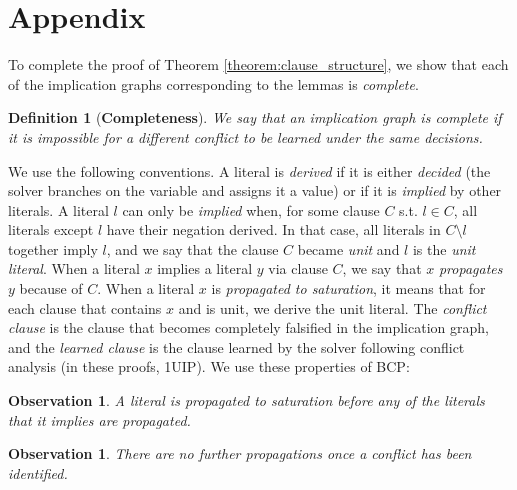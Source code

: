 \documentclass[10pt,a4paper]{article}
\newtheorem{definition}[theorem]{Definition}
\newtheorem{observation}[theorem]{Observation}
\begin{document}
\newpage 



\newpage

\section{Appendix}
To complete the proof of Theorem \ref{theorem:clause_structure}, we show that each of the implication graphs corresponding to the lemmas is \textit{complete}.

\begin{definition}[\bf Completeness]
We say that an implication graph is complete if it is impossible for a different conflict to be learned under the same decisions. 
\end{definition}

We use the following conventions. A literal is \textit{derived} if it is either \textit{decided} (the solver branches on the variable and assigns it a value) or if it is \textit{implied} by other literals. A literal $l$ can only be \textit{implied} when, for some clause $C$ s.t. $l \in C$, all literals except $l$ have their negation derived. In that case, all literals in $C \setminus l$ together imply $l$, and we say that the clause $C$ became \textit{unit} and $l$ is the \textit{unit literal}. When a literal $x$ implies a literal $y$ via clause $C$, we say that $x$ \textit{propagates} $y$ because of $C$. When a literal $x$ is \textit{propagated to saturation}, it means that for each clause that contains $x$ and is unit, we derive the unit literal. The \textit{conflict clause} is the clause that becomes completely falsified in the implication graph, and the \textit{learned clause} is the clause learned by the solver following conflict analysis (in these proofs, 1UIP). We use these properties of BCP:

\begin{observation} 
A literal is propagated to saturation before any of the literals that it implies are propagated.
\end{observation}

\begin{observation}
There are no further propagations once a conflict has been identified. 
\end{observation}
\end{document}
